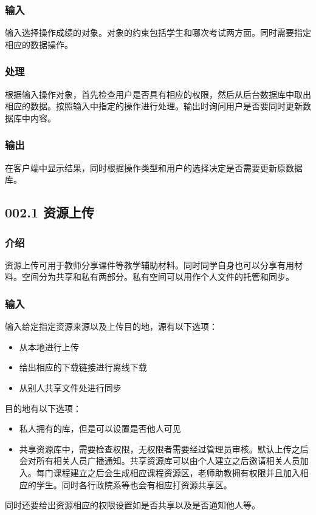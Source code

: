     \subsubsection{输入}
    输入选择操作成绩的对象。对象的约束包括学生和哪次考试两方面。同时需要指定相应的数据操作。
    \subsubsection{处理}
    根据输入操作对象，首先检查用户是否具有相应的权限，然后从后台数据库中取出相应的数据。按照输入中指定的操作进行处理。输出时询问用户是否要同时更新数据库中内容。
    \subsubsection{输出}
    在客户端中显示结果，同时根据操作类型和用户的选择决定是否需要更新原数据库。

  \subsection{002.1 资源上传}
    \subsubsection{介绍}
    资源上传可用于教师分享课件等教学辅助材料。同时同学自身也可以分享有用材料。空间分为共享和私有两部分。私有空间可以用作个人文件的托管和同步。
    \subsubsection{输入}
    输入给定指定资源来源以及上传目的地，源有以下选项：
    \begin{itemize}
      \item 从本地进行上传
      \item 给出相应的下载链接进行离线下载
      \item 从别人共享文件处进行同步
    \end{itemize}
    目的地有以下选项：
    \begin{itemize}
      \item 私人拥有的库，但是可以设置是否他人可见
      \item 共享资源库中，需要检查权限，无权限者需要经过管理员审核。默认上传之后会对所有相关人员广播通知。共享资源库可以由个人建立之后邀请相关人员加入。每门课程建立之后会生成相应课程资源区，老师助教拥有权限并且加入相应的学生。同时各行政院系等也会有相应打资源共享区。
    \end{itemize}
    同时还要给出资源相应的权限设置如是否共享以及是否通知他人等。
